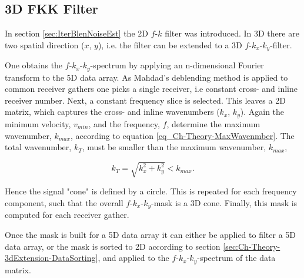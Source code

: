 \subsection{3D FKK Filter} \label{sec:Ch-Theory-3dExtension-FKK}

In section \ref{sec:IterBlenNoiseEst} the 2D $f$-$k$ filter was introduced. In 3D there are two spatial direction ($x$, $y$), i.e. the filter can be extended to a 3D $f$-$k_x$-$k_y$-filter.

One obtains the $f$-$k_x$-$k_y$-spectrum by applying an n-dimensional Fourier transform to the 5D data array. As Mahdad's deblending method is applied to common receiver gathers one picks a single receiver, i.e constant cross- and inline receiver number. Next, a constant frequency slice is selected. This leaves a 2D matrix, which captures the cross- and inline wavenumbers ($k_x$, $k_y$). Again the minimum velocity, $v_{min}$, and the frequency, $f$, determine the maximum wavenumber, $k_{max}$, according to equation \ref{eq_Ch-Theory-MaxWavenmber}. The total wavenumber, $k_{T}$, must be smaller than the maximum wavenumber, $k_{max}$,

\begin{equation}
	k_{T} = \sqrt{k_x^2 + k_{y}^2} < k_{max}.
	\label{eq:Ch-Theory-TotalWavenumber}
\end{equation}

Hence the signal "cone" is defined by a circle. This is repeated for each frequency component, such that the overall $f$-$k_x$-$k_y$-mask is a 3D cone. Finally, this mask is computed for each receiver gather.

Once the mask is built for a 5D data array it can either be applied to filter a 5D data array, or the mask is sorted to 2D according to section \ref{sec:Ch-Theory-3dExtension-DataSorting}, and applied to the $f$-$k_x$-$k_y$-spectrum of the data matrix.


















